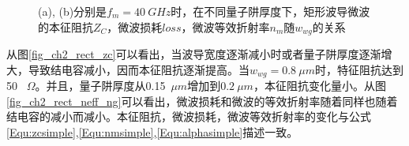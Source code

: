 \begin{figure}[htb]
	\small
\caption{(a), (b)分别是$f_m = 40~GHz$时，在不同量子阱厚度下，矩形波导微波的本征阻抗$Z_C$，微波损耗$loss$，微波等效折射率$n_m$随$w_{wg}$的关系}
\label{fig_ch2_rect_microwave_property}	
\end{figure}
从图\ref{fig_ch2_rect_zc}可以看出，当波导宽度逐渐减小时或者量子阱厚度逐渐增大，导致结电容减小，因而本征阻抗逐渐提高。当$w_{wg} = 0.8~ \mu m$时，特征阻抗达到50~ $\Omega$。并且，量子阱厚度从0.15~$\mu m$增加到$0.2~\mu m$，本征阻抗变化量小。从图\ref{fig_ch2_rect_neff_ng}可以看出，微波损耗和微波的等效折射率随着同样也随着结电容的减小而减小。本征阻抗，微波损耗，微波等效折射率的变化与公式\ref{Equ:zcsimple},\ref{Equ:nmsimple},\ref{Equ:alphasimple}描述一致。

